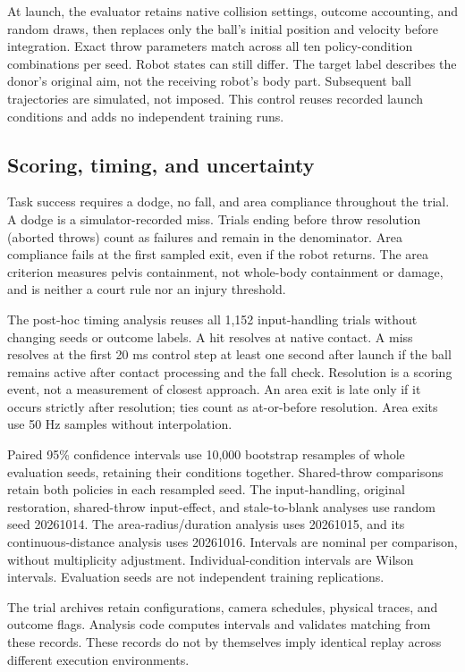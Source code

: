 At launch, the evaluator retains native collision settings, outcome accounting,
and random draws, then replaces only the ball's initial position and velocity
before integration. Exact throw parameters match across all ten
policy-condition combinations per seed. Robot states can still differ. The
target label describes the donor's original aim, not the receiving robot's body
part. Subsequent ball trajectories are simulated, not imposed. This control
reuses recorded launch conditions and adds no independent training runs.

\subsection{Scoring, timing, and uncertainty}
Task success requires a dodge, no fall, and area compliance throughout the
trial. A dodge is a simulator-recorded miss. Trials ending before throw
resolution (aborted throws) count as failures and remain in the denominator.
Area compliance fails at the first sampled exit, even if the robot returns.
The area criterion measures pelvis containment, not whole-body containment or
damage, and is neither a court rule nor an injury threshold.

The post-hoc timing analysis reuses all 1,152 input-handling trials without
changing seeds or outcome labels. A hit resolves at native contact. A miss
resolves at the first 20 ms control step at least one second after launch if
the ball remains active after contact processing and the fall check. Resolution
is a scoring event, not a measurement of closest approach. An area exit is late
only if it occurs strictly after resolution; ties count as at-or-before
resolution. Area exits use 50 Hz samples without interpolation.

Paired 95\% confidence intervals use 10,000 bootstrap resamples of whole
evaluation seeds, retaining their conditions together. Shared-throw comparisons
retain both policies in each resampled seed. The input-handling, original
restoration, shared-throw input-effect, and stale-to-blank analyses use random
seed 20261014. The area-radius/duration analysis uses 20261015, and its
continuous-distance analysis uses 20261016. Intervals are nominal per comparison,
without multiplicity adjustment. Individual-condition intervals are Wilson
intervals. Evaluation seeds are not independent training replications.

The trial archives retain configurations, camera schedules, physical traces,
and outcome flags. Analysis code computes intervals and validates matching
from these records. These records do not by themselves imply identical replay
across different execution environments.

